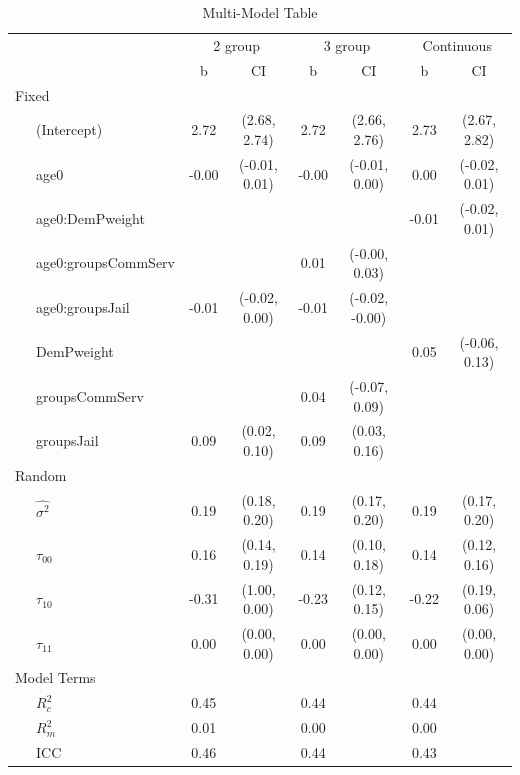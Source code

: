 \documentclass[]{article}
\begin{document}
\begin{table}[tbp]
\begin{center}
\begin{threeparttable}
\caption{\label{tab:unnamed-chunk-29}Multi-Model Table}
\begin{tabular}{lcccccc}
\toprule
 & \multicolumn{2}{c}{2 group} & \multicolumn{2}{c}{3 group} & \multicolumn{2}{c}{Continuous} \\
\cmidrule(r){2-3} \cmidrule(r){4-5} \cmidrule(r){6-7}
  & b & CI & b & CI & b & CI\\
\midrule
Fixed &  &  &  &  &  & \\
\ \ \ (Intercept) & 2.72 & (2.68, 2.74) & 2.72 & (2.66, 2.76) & 2.73 & (2.67, 2.82)\\
\ \ \ age0 & -0.00 & (-0.01, 0.01) & -0.00 & (-0.01, 0.00) & 0.00 & (-0.02, 0.01)\\
\ \ \ age0:DemPweight &  &  &  &  & -0.01 & (-0.02, 0.01)\\
\ \ \ age0:groupsCommServ &  &  & 0.01 & (-0.00, 0.03) &  & \\
\ \ \ age0:groupsJail & -0.01 & (-0.02, 0.00) & -0.01 & (-0.02, -0.00) &  & \\
\ \ \ DemPweight &  &  &  &  & 0.05 & (-0.06, 0.13)\\
\ \ \ groupsCommServ &  &  & 0.04 & (-0.07, 0.09) &  & \\
\ \ \ groupsJail & 0.09 & (0.02, 0.10) & 0.09 & (0.03, 0.16) &  & \\
Random &  &  &  &  &  & \\
\ \ \ $\hat{\sigma^2}$ & 0.19 & (0.18, 0.20) & 0.19 & (0.17, 0.20) & 0.19 & (0.17, 0.20)\\
\ \ \ $\tau_{00}$ & 0.16 & (0.14, 0.19) & 0.14 & (0.10, 0.18) & 0.14 & (0.12, 0.16)\\
\ \ \ $\tau_{10}$ & -0.31 & (1.00, 0.00) & -0.23 & (0.12, 0.15) & -0.22 & (0.19, 0.06)\\
\ \ \ $\tau_{11}$ & 0.00 & (0.00, 0.00) & 0.00 & (0.00, 0.00) & 0.00 & (0.00, 0.00)\\
Model Terms &  &  &  &  &  & \\
\ \ \ $R^2_c$ & 0.45 &  & 0.44 &  & 0.44 & \\
\ \ \ $R^2_m$ & 0.01 &  & 0.00 &  & 0.00 & \\
\ \ \ ICC & 0.46 &  & 0.44 &  & 0.43 & \\
\bottomrule
\end{tabular}
\end{threeparttable}
\end{center}
\end{table}
\end{document}
